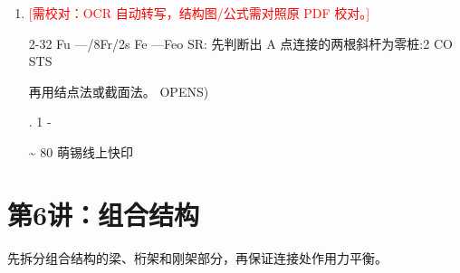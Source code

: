 \documentclass[UTF8,12pt,a4paper,openany]{ctexbook}
\newcommand{\TODO}[1]{\textcolor{red}{[需校对：#1]}}
\begin{document}
\begin{enumerate}[label=\textbf{\arabic*.},leftmargin=2em]
\item \TODO{OCR 自动转写，结构图/公式需对照原 PDF 校对。}\par 2-32 Fu —/8Fr/2s Fe —Feo SR: 先判断出 A 点连接的两根斜杆为零桩:2 CO STS\par 再用结点法或截面法。                                            OPENS)\par . 1 -\par \textasciitilde{} 80                                                      萌锡线上快印
\end{enumerate}
\chapter{第6讲：组合结构}
\begin{tcolorbox}[title=解析总览]
先拆分组合结构的梁、桁架和刚架部分，再保证连接处作用力平衡。
\end{tcolorbox}
\end{document}

